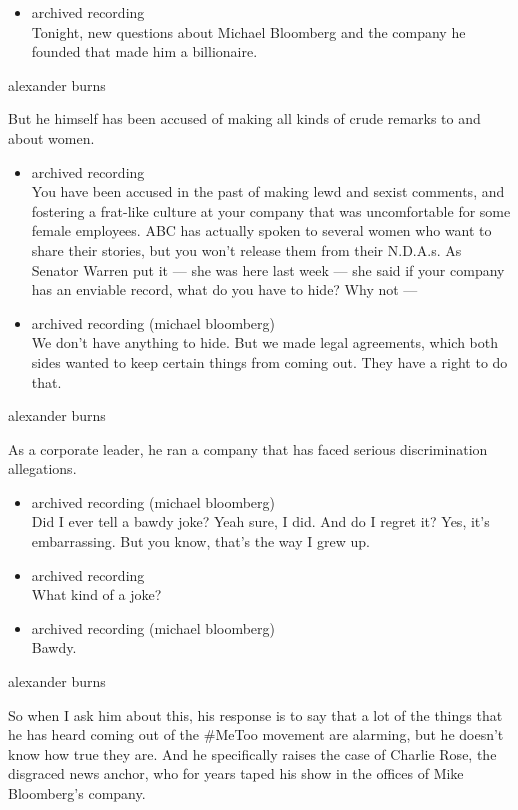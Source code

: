 \begin{itemize}
\tightlist
\item
  archived recording\\
  Tonight, new questions about Michael Bloomberg and the company he
  founded that made him a billionaire.
\end{itemize}

alexander burns

But he himself has been accused of making all kinds of crude remarks to
and about women.

\begin{itemize}
\item
  archived recording\\
  You have been accused in the past of making lewd and sexist comments,
  and fostering a frat-like culture at your company that was
  uncomfortable for some female employees. ABC has actually spoken to
  several women who want to share their stories, but you won't release
  them from their N.D.A.s. As Senator Warren put it --- she was here
  last week --- she said if your company has an enviable record, what do
  you have to hide? Why not ---
\item
  archived recording (michael bloomberg)\\
  We don't have anything to hide. But we made legal agreements, which
  both sides wanted to keep certain things from coming out. They have a
  right to do that.
\end{itemize}

alexander burns

As a corporate leader, he ran a company that has faced serious
discrimination allegations.

\begin{itemize}
\item
  archived recording (michael bloomberg)\\
  Did I ever tell a bawdy joke? Yeah sure, I did. And do I regret it?
  Yes, it's embarrassing. But you know, that's the way I grew up.
\item
  archived recording\\
  What kind of a joke?
\item
  archived recording (michael bloomberg)\\
  Bawdy.
\end{itemize}

alexander burns

So when I ask him about this, his response is to say that a lot of the
things that he has heard coming out of the \#MeToo movement are
alarming, but he doesn't know how true they are. And he specifically
raises the case of Charlie Rose, the disgraced news anchor, who for
years taped his show in the offices of Mike Bloomberg's company.

